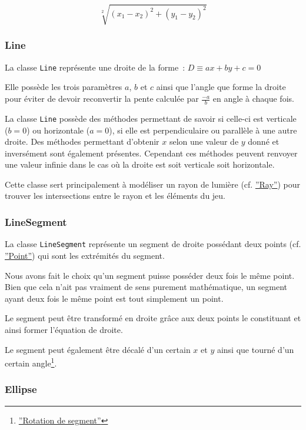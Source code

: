 \documentclass[]{article}
\begin{document}
$$ \sqrt[2]{(x_1 - x_2)^2 + (y_1 - y_2)^2} $$

\subsubsection{Line}

La classe \texttt{Line} représente une droite de la forme~: 
$ D \equiv ax + by + c = 0 $

Elle possède les trois paramètres $ a $, $ b $ et $ c $ ainsi que l'angle
que forme la droite pour éviter de devoir reconvertir la pente calculée par $ \frac{-a}{b} $
en angle à chaque fois.

La classe \texttt{Line} possède des méthodes permettant de savoir si celle-ci est 
verticale ($ b = 0 $) ou horizontale ($ a = 0 $), si elle est perpendiculaire ou parallèle à une autre droite.
Des méthodes permettant d'obtenir $ x $ selon une valeur de $ y $ donné et inversément sont également
présentes. Cependant ces méthodes peuvent renvoyer une valeur infinie dans le cas où la droite 
est soit verticale soit horizontale.

Cette classe sert principalement à modéliser un rayon de lumière (cf. \hyperref[Ray]{''Ray''}) pour trouver 
les intersections entre le rayon et les éléments du jeu.

\subsubsection{LineSegment}

La classe \texttt{LineSegment} représente un segment de droite possédant
deux points (cf. \hyperref[Point]{''Point''}) qui sont les extrémités du segment.

Nous avons fait le choix qu'un segment puisse posséder deux fois le même point.
Bien que cela n'ait pas vraiment de sens purement mathématique, un segment
ayant deux fois le même point est tout simplement un point.

Le segment peut être transformé en droite grâce aux deux points
le constituant et ainsi former l'équation de droite.

Le segment peut également être décalé d'un certain $ x $ et $ y $ ainsi que tourné 
d'un certain angle\footnote{\hyperref[AnnexeRotation]{''Rotation de segment''}}.



\subsubsection{Ellipse}
\end{document}
